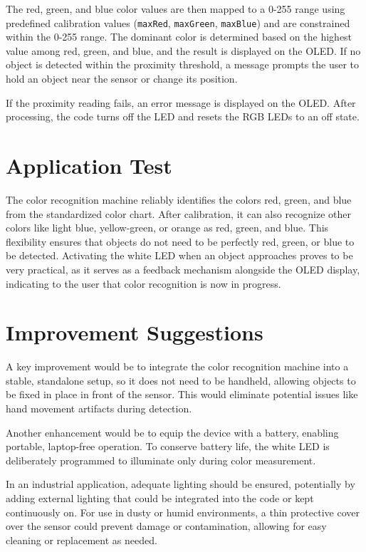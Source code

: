 The red, green, and blue color values are then mapped to a 0-255 range using predefined calibration values (\texttt{maxRed}, \texttt{maxGreen}, \texttt{maxBlue}) and are constrained within the 0-255 range. The dominant color is determined based on the highest value among red, green, and blue, and the result is displayed on the OLED. If no object is detected within the proximity threshold, a message prompts the user to hold an object near the sensor or change its position.

If the proximity reading fails, an error message is displayed on the OLED. After processing, the code turns off the LED and resets the RGB LEDs to an off state.

{
	\label{AppAPDS9960Main}
}


\section{Application Test}

The color recognition machine reliably identifies the colors red, green, and blue from the standardized color chart. After calibration, it can also recognize other colors like light blue, yellow-green, or orange as red, green, and blue. This flexibility ensures that objects do not need to be perfectly red, green, or blue to be detected. Activating the white LED when an object approaches proves to be very practical, as it serves as a feedback mechanism alongside the OLED display, indicating to the user that color recognition is now in progress.

\section{Improvement Suggestions}

A key improvement would be to integrate the color recognition machine into a stable, standalone setup, so it does not need to be handheld, allowing objects to be fixed in place in front of the sensor. This would eliminate potential issues like hand movement artifacts during detection.

Another enhancement would be to equip the device with a battery, enabling portable, laptop-free operation. To conserve battery life, the white LED is deliberately programmed to illuminate only during color measurement. 

In an industrial application, adequate lighting should be ensured, potentially by adding external lighting that could be integrated into the code or kept continuously on. For use in dusty or humid environments, a thin protective cover over the sensor could prevent damage or contamination, allowing for easy cleaning or replacement as needed.

